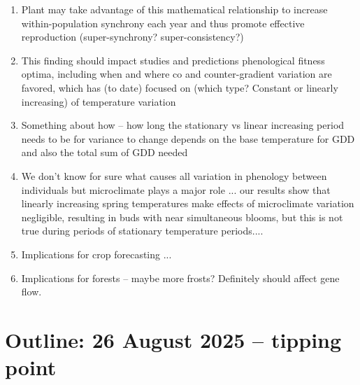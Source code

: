\documentclass[11pt]{article}
\begin{document}
\begin{enumerate}
\begin{enumerate}
\begin{enumerate}
\item Plant may take advantage of this mathematical relationship to increase within-population synchrony each year and thus promote effective reproduction (super-synchrony? super-consistency?)
\item This finding should impact studies and predictions phenological fitness optima, including when and where co and counter-gradient variation are favored, which has (to date) focused on (which type? Constant or linearly increasing) of temperature variation \citep{gauzere2020}
\item Something about how -- how long the stationary vs linear increasing period needs to be for variance to change depends on the base temperature for GDD and also the total sum of GDD needed
\item We don't know for sure what causes all variation in phenology between individuals but microclimate plays a major role ... our results show that linearly increasing spring temperatures  
make effects of microclimate variation negligible, resulting in buds with near simultaneous blooms, but this is not true during periods of stationary temperature periods.... 
\item Implications for crop forecasting ...
\item Implications for forests -- maybe more frosts? Definitely should affect gene flow. 
\end{enumerate}
\end{enumerate}
\end{enumerate}



\section{Outline: 26 August 2025 -- tipping point} %
\end{document}
